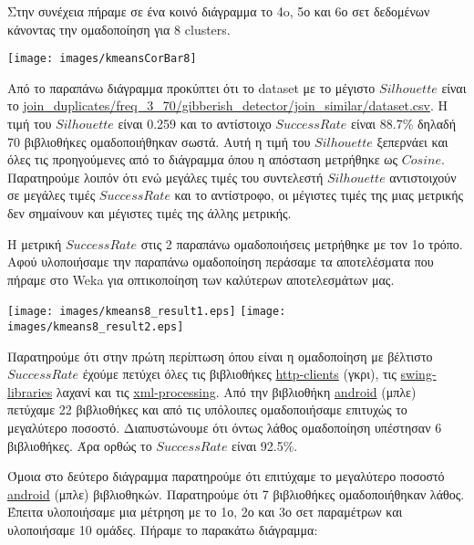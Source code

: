 Στην συνέχεια πήραμε σε ένα κοινό διάγραμμα το 4o, 5ο και 6ο σετ δεδομένων κάνοντας την ομαδοποίηση για 8 clusters.

\noindent\begin{minipage}{\linewidth}
    \centering
    \texttt{[image: images/kmeansCorBar8]}
    \label{fig:kmeansCorBar8}
\end{minipage}

Από το παραπάνω διάγραμμα προκύπτει ότι το dataset με το μέγιστο $Silhouette$ είναι το \url{join_duplicates/freq_3_70/gibberish_detector/join_similar/dataset.csv}. Η τιμή του $Silhouette$ είναι 0.259 και το αντίστοιχο $SuccessRate$ είναι 88.7\% δηλαδή 70 βιβλιοθήκες ομαδοποιήθηκαν σωστά. Αυτή η τιμή του $Silhouette$ ξεπερνάει και όλες τις προηγούμενες από το διάγραμμα όπου η απόσταση μετρήθηκε ως $Cosine$. Παρατηρούμε λοιπόν ότι ενώ μεγάλες τιμές του συντελεστή $Silhouette$ αντιστοιχούν σε μεγάλες τιμές $SuccessRate$ και το αντίστροφο, οι μέγιστες τιμές της μιας μετρικής δεν σημαίνουν και μέγιστες τιμές της άλλης μετρικής.

Η μετρική $Success Rate$ στις 2 παραπάνω ομαδοποιήσεις μετρήθηκε με τον 1ο τρόπο.
Αφού υλοποιήσαμε την παραπάνω ομαδοποίηση περάσαμε τα αποτελέσματα που πήραμε στο Weka για οπτικοποίηση των καλύτερων αποτελεσμάτων μας.
\noindent\begin{minipage}{\linewidth}
    \centering
    \texttt{[image: images/kmeans8\_result1.eps]}
    \texttt{[image: images/kmeans8\_result2.eps]}
    \label{fig:kmeans8_result}
\end{minipage}

Παρατηρούμε ότι στην πρώτη περίπτωση όπου είναι η ομαδοποίηση με βέλτιστο $Success Rate$ έχούμε πετύχει όλες τις βιβλιοθήκες \url{http-clients} (γκρι), τις \url{swing-libraries} λαχανί και τις \url{xml-processing}. Από την βιβλιοθήκη \url{android} (μπλε) πετύχαμε 22 βιβλιοθήκες και από τις υπόλοιπες ομαδοποιήσαμε επιτυχώς το μεγαλύτερο ποσοστό. Διαπυστώνουμε ότι όντως λάθος ομαδοποίηση υπέστησαν 6 βιβλιοθήκες. Άρα ορθώς το $Success Rate$ είναι 92.5\%.

Όμοια στο δεύτερο διάγραμμα παρατηρούμε ότι επιτύχαμε το μεγαλύτερο ποσοστό \url{android} (μπλε) βιβλιοθηκών. Παρατηρούμε ότι 7 βιβλιοθήκες ομαδοποιήθηκαν λάθος. 
Έπειτα υλοποιήσαμε μια μέτρηση με το 1ο, 2ο και 3ο σετ παραμέτρων και υλοποιήσαμε 10 ομάδες. Πήραμε το παρακάτω διάγραμμα:

